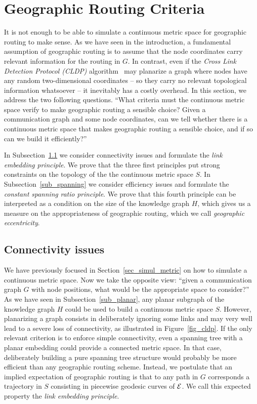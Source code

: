 \documentclass{article}
\newcommand{\englobing}{{\cal E}}
\begin{document}
\section{Geographic Routing Criteria}
\label{sec_criteria}
It is not enough to be able to simulate a continuous metric space for geographic routing to make sense. As we have seen in the introduction, a fundamental assumption of geographic routing is to assume that the node coordinates carry relevant information for the routing in $G$. In contrast, even if the {\em Cross Link Detection Protocol (CLDP)} algorithm~\cite{bib_cldp} may planarize a graph where nodes have any random two-dimensional coordinates -- so they carry no relevant topological information whatsoever -- it inevitably has a costly overhead.
In this section, we address the two following questions.
``What criteria must the continuous metric space verify to make geographic routing a sensible choice? Given a communication graph and some node coordinates, can we tell whether there is a continuous metric space that makes geographic routing a sensible choice, and if so can we build it efficiently?''

In Subsection~\ref{sub_simul_com} we consider connectivity issues and formulate the {\em link embedding principle}. We prove that the three first principles put strong constraints on the topology of the the continuous metric space $S$.
In Subsection~\ref{sub_spanning} we consider efficiency issues and formulate the {\em constant spanning ratio principle}. We prove that this fourth principle can be interpreted as a condition on the size of the knowledge graph $H$, which gives us a measure on the appropriateness of geographic routing, which we call {\em geographic eccentricity}.

\subsection{Connectivity issues}
\label{sub_simul_com}
We have previously focused in Section~\ref{sec_simul_metric} on how to simulate a continuous metric space. Now we take the opposite view: ``given a communication graph $G$ with node positions, what would be the appropriate space to consider?'' As we have seen in Subsection~\ref{sub_planar}, any planar subgraph of the knowledge graph $H$ could be used to build a continuous metric space $S$. However, planarizing a graph consists in deliberately ignoring some links and may very well lead to a severe loss of connectivity, as illustrated in Figure~\ref{fig_cldp}. If the only relevant criterion is to enforce simple connectivity, even a spanning tree with a planar embedding could provide a connected metric space. In that case, deliberately building a pure spanning tree structure would probably be more efficient than any geographic routing scheme. Instead, we postulate that an implied expectation of geographic routing is that to any path in $G$ corresponds a trajectory in $S$ consisting in piecewise geodesic curves of $\englobing$. We call this expected property the {\em link embedding principle}.
\end{document}
